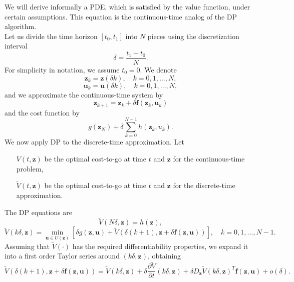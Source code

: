 We will derive informally a PDE, which is satisfied by the value function, 
under certain assumptions. This equation is the continuous-time analog of the DP algorithm.\\

Let us divide the time horizon $[t_0,t_1]$ into $N$ pieces using the discretization interval
\begin{equation*}
\delta=\frac{t_1-t_0}{N}.
\end{equation*}
For simplicity in notation, we assume $t_0=0$. We denote
\begin{equation*}
\bm{z}_k=\bm{z}(\delta k),\quad k=0,1,\dots,N,
\end{equation*}
\begin{equation*}
\bm{u}_k=\bm{u}(\delta k),\quad k=0,1,\dots,N,
\end{equation*}
and we approximate the continuous-time system by
\begin{equation*}
\bm{z}_{k+1}=\bm{z}_k+\delta\bm{f}(\bm{z}_k,\bm{u}_k)
\end{equation*}
and the cost function by
\begin{equation*}
g(\bm{z}_N) + \delta\sum_{k=0}^{N-1}h(\bm{z}_k,u_k).
\end{equation*}
We now apply DP to the discrete-time approximation. Let
\begin{enumerate}

\item[$V(t,\bm{z})$] be the optimal cost-to-go at time $t$ and $\bm{z}$ for the continuous-time problem,

\item[$\tilde{V}(t,\bm{z})$] be the optimal cost-to-go at time $t$ and 
$\bm{z}$ for the discrete-time approximation.

\end{enumerate}
The DP equations are
\begin{equation*}
\tilde{V}(N\delta,\bm{z}) = h(\bm{z}),
\end{equation*}
\begin{equation*}
\tilde{V}(k\delta,\bm{z}) = \min_{\bm{u}\in U(\bm{z})}\left[\delta g(\bm{z},\bm{u})+\tilde{V}\left(\delta(k+1),\bm{z}+\delta \bm{f}(\bm{z},\bm{u})\right)\right],\quad k=0,1,\dots,N-1.
\end{equation*}
Assuming that $\tilde{V}(\cdot)$ has the required differentiability properties, 
we expand it into a first order Taylor series around $(k\delta,\bm{z})$, obtaining
\begin{equation}
\tilde{V}(\delta(k+1),\bm{z}+\delta\bm{f}(\bm{z},\bm{u}))=\tilde{V}(k\delta,\bm{z})+\delta\frac{\partial\tilde{V}}{\partial t}(k\delta,\bm{z})+\delta D_{\bm{z}}\tilde{V}(k\delta,\bm{z})^T\bm{f}(\bm{z},\bm{u})+o(\delta).
\end{equation}
